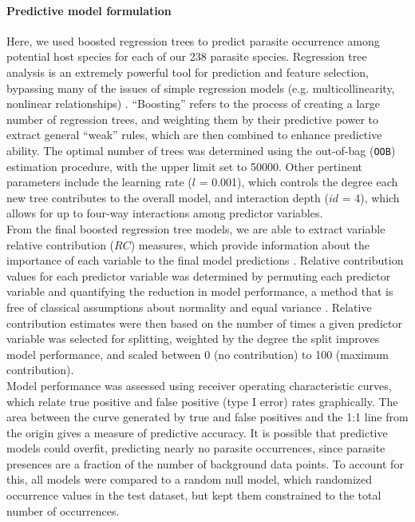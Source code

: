 \documentclass[12pt]{article}
\begin{document}
 \paragraph{Predictive model formulation}
  Here, we used boosted regression trees to predict parasite occurrence among potential host species for each of our 238 parasite species. Regression tree analysis is an extremely powerful tool for prediction and feature selection, bypassing many of the issues of simple regression models (e.g. multicollinearity, nonlinear relationships) \cite{elith2008, dallas2014}. “Boosting” refers to the process of creating a large number of regression trees, and weighting them by their predictive power to extract general “weak” rules, which are then combined to enhance predictive ability. The optimal number of trees was determined using the out-of-bag (\texttt{OOB}) estimation procedure, with the upper limit set to 50000. Other pertinent parameters include the learning rate ($l$ = 0.001), which controls the degree each new tree contributes to the overall model, and interaction depth ($id$ = 4), which allows for up to four-way interactions among predictor variables. \\
  
  From the final boosted regression tree models, we are able to extract variable relative contribution ($RC$) measures, which provide information about the importance of each variable to the final model predictions \cite{breiman2001}. Relative contribution values for each predictor variable was determined by permuting each predictor variable and quantifying the reduction in model performance, a method that is free of classical assumptions about normality and equal variance \cite{anderson2001}. Relative contribution estimates were then based on the number of times a given predictor variable was selected for splitting, weighted by the degree the split improves model performance, and scaled between 0 (no contribution) to 100 (maximum contribution). \\
  
  Model performance was assessed using receiver operating characteristic curves, which relate true positive and false positive (type I error) rates graphically. The area between the curve generated by true and false positives and the 1:1 line from the origin gives a measure of predictive accuracy. It is possible that predictive models could overfit, predicting nearly no parasite occurrences, since parasite presences are a fraction of the number of background data points. To account for this, all models were compared to a random null model, which randomized occurrence values in the test dataset, but kept them constrained to the total number of occurrences.  
  
\end{document}
